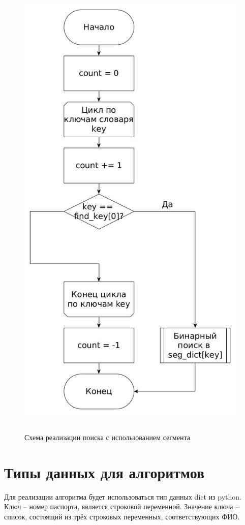 \FloatBarrier
\begin{figure}[hp]
	\begin{center}
		\includegraphics[width=11cm, height=23cm]{graph/segment.jpg}
	\end{center}
	\caption{Схема реализации поиска с использованием сегмента}
\end{figure}
\FloatBarrier

\section{Типы данных для алгоритмов}
Для реализации алгоритма будет использоваться тип данных dict из python.
Ключ -- номер паспорта, является строковой переменной.
Значение ключа -- список, состоящий из трёх строковых переменных, соответствующих ФИО.

